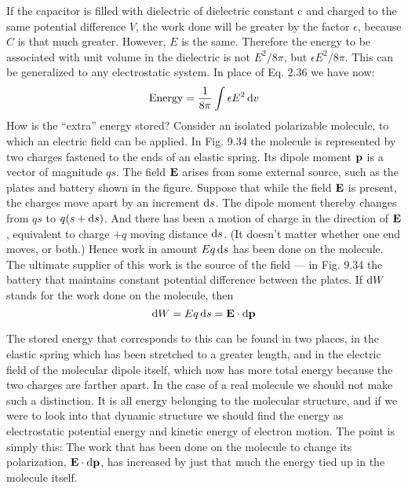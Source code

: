 If the capacitor is filled with dielectric of dielectric constant c and
charged to the same potential difference $V$, the work done will be
greater by the factor $\epsilon$, because $C$ is that much greater. However,
$E$ is the same. Therefore the energy to be associated with unit
volume in the dielectric is not $E^2/8\pi$, but $\epsilon E^2/8\pi$. This can be generalized
to any electrostatic system. In place of Eq. 2.36 we have now:
\begin{equation}
  \text{Energy} = \frac{1}{8\pi}\int\epsilon E^2\operatorname{d\!} v
\end{equation}
How is the ``extra'' energy stored? Consider an isolated 
polarizable molecule, to which an electric field can be applied. In Fig. 9.34
the molecule is represented by two charges fastened to the ends of
an elastic spring. Its dipole moment $\mathbf{p}$ is a vector of magnitude $qs$.
The field $\mathbf{E}$ arises from some external source, such as the plates and
battery shown in the figure. Suppose that while the field $\mathbf{E}$ is present,
the charges move apart by an increment $\operatorname{d\!} s$. The dipole moment
thereby changes from $qs$ to $q(s + \operatorname{d\!} s)$. And there has been a motion
of charge in the direction of $\mathbf{E}$, equivalent to charge $+q$ moving distance
$\operatorname{d\!} s$. (It doesn't matter whether one end moves, or both.)
Hence work in amount $Eq\operatorname{d\!} s$ has been done on the molecule. The
ultimate supplier of this work is the source of the field --- in Fig. 9.34
the battery that maintains constant potential difference between the
plates. If $\operatorname{d\!} W$ stands for the work done on the molecule, then
\begin{equation}
  \operatorname{d\!} W = Eq\operatorname{d\!} s = \mathbf{E}\cdot\operatorname{d\!}\mathbf{p}
\end{equation}

The stored energy that corresponds to this can be found in two
places, in the elastic spring which has been stretched to a greater
length, and in the electric field of the molecular dipole itself, which
now has more total energy because the two charges are farther apart.
In the case of a real molecule we should not make such a distinction.
It is all energy belonging to the molecular structure, and if we were
to look into that dynamic structure we should find the energy as
electrostatic potential energy and kinetic energy of electron motion.
The point is simply this: The work that has been done on the molecule
to change its polarization, $\mathbf{E}\cdot\operatorname{d\!}\mathbf{p}$, has increased by just that much
the energy tied up in the molecule itself.

